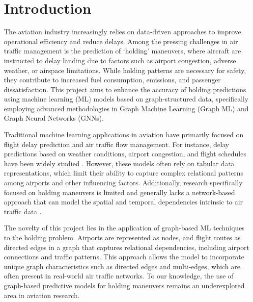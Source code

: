 \chapter[Introduction]{Introduction}
\label{Introdução}

\noindent The aviation industry increasingly relies on data-driven approaches to improve operational efficiency and reduce delays. Among the pressing challenges in air traffic management is the prediction of `holding' maneuvers, where aircraft are instructed to delay landing due to factors such as airport congestion, adverse weather, or airspace limitations. While holding patterns are necessary for safety, they contribute to increased fuel consumption, emissions, and passenger dissatisfaction. This project aims to enhance the accuracy of holding predictions using machine learning (ML) models based on graph-structured data, specifically employing advanced methodologies in Graph Machine Learning (Graph ML) and Graph Neural Networks (GNNs).

Traditional machine learning applications in aviation have primarily focused on flight delay prediction and air traffic flow management. For instance, delay predictions based on weather conditions, airport congestion, and flight schedules have been widely studied \cite{lambelho2020assessing, gui2019flight}. However, these models often rely on tabular data representations, which limit their ability to capture complex relational patterns among airports and other influencing factors. Additionally, research specifically focused on holding maneuvers is limited and generally lacks a network-based approach that can model the spatial and temporal dependencies intrinsic to air traffic data \cite{smith2019holdingpatterns, al-dubai2020networking}.

The novelty of this project lies in the application of graph-based ML techniques to the holding problem. Airports are represented as nodes, and flight routes as directed edges in a graph that captures relational dependencies, including airport connections and traffic patterns. This approach allows the model to incorporate unique graph characteristics such as directed edges and multi-edges, which are often present in real-world air traffic networks. To our knowledge, the use of graph-based predictive models for holding maneuvers remains an underexplored area in aviation research.

